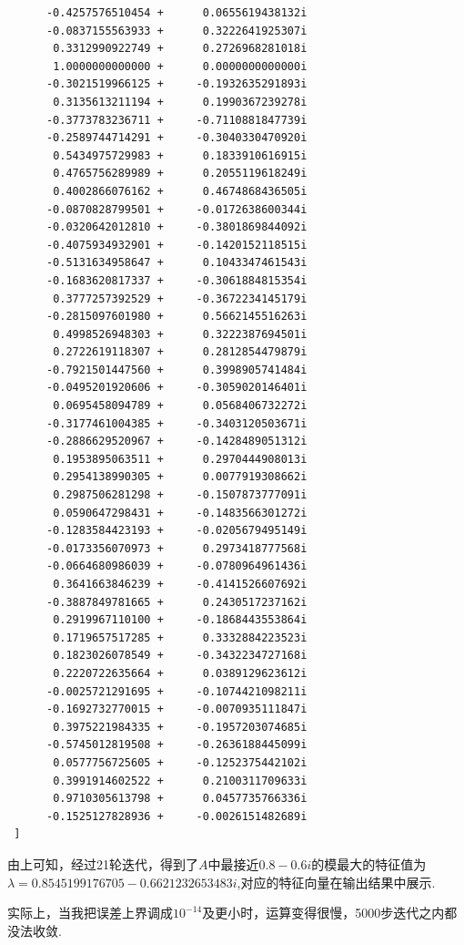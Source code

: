 \documentclass[12pt,a4paper,utf8]{ctexart}
\begin{document}
\begin{enumerate}
\begin{itemize}
\begin{lstlisting}
      -0.4257576510454 +      0.0655619438132i
      -0.0837155563933 +      0.3222641925307i
       0.3312990922749 +      0.2726968281018i
       1.0000000000000 +      0.0000000000000i
      -0.3021519966125 +     -0.1932635291893i
       0.3135613211194 +      0.1990367239278i
      -0.3773783236711 +     -0.7110881847739i
      -0.2589744714291 +     -0.3040330470920i
       0.5434975729983 +      0.1833910616915i
       0.4765756289989 +      0.2055119618249i
       0.4002866076162 +      0.4674868436505i
      -0.0870828799501 +     -0.0172638600344i
      -0.0320642012810 +     -0.3801869844092i
      -0.4075934932901 +     -0.1420152118515i
      -0.5131634958647 +      0.1043347461543i
      -0.1683620817337 +     -0.3061884815354i
       0.3777257392529 +     -0.3672234145179i
      -0.2815097601980 +      0.5662145516263i
       0.4998526948303 +      0.3222387694501i
       0.2722619118307 +      0.2812854479879i
      -0.7921501447560 +      0.3998905741484i
      -0.0495201920606 +     -0.3059020146401i
       0.0695458094789 +      0.0568406732272i
      -0.3177461004385 +     -0.3403120503671i
      -0.2886629520967 +     -0.1428489051312i
       0.1953895063511 +      0.2970444908013i
       0.2954138990305 +      0.0077919308662i
       0.2987506281298 +     -0.1507873777091i
       0.0590647298431 +     -0.1483566301272i
      -0.1283584423193 +     -0.0205679495149i
      -0.0173356070973 +      0.2973418777568i
      -0.0664680986039 +     -0.0780964961436i
       0.3641663846239 +     -0.4141526607692i
      -0.3887849781665 +      0.2430517237162i
       0.2919967110100 +     -0.1868443553864i
       0.1719657517285 +      0.3332884223523i
       0.1823026078549 +     -0.3432234727168i
       0.2220722635664 +      0.0389129623612i
      -0.0025721291695 +     -0.1074421098211i
      -0.1692732770015 +     -0.0070935111847i
       0.3975221984335 +     -0.1957203074685i
      -0.5745012819508 +     -0.2636188445099i
       0.0577756725605 +     -0.1252375442102i
       0.3991914602522 +      0.2100311709633i
       0.9710305613798 +      0.0457735766336i
      -0.1525127828936 +     -0.0026151482689i
 ]
    \end{lstlisting}
    \par
    由上可知，经过21轮迭代，得到了$A$中最接近$0.8-0.6i$的模最大的特征值为$\lambda = 0.8545199176705 - 0.6621232653483i$,对应的特征向量在输出结果中展示.
    \par
    实际上，当我把误差上界调成$10^{-14}$及更小时，运算变得很慢，5000步迭代之内都没法收敛.
    \end{itemize}
\end{enumerate}
\end{document}
